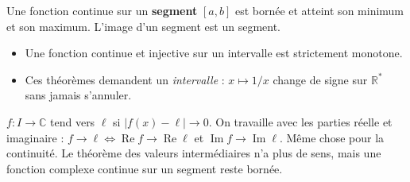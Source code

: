 \documentclass[11pt]{article}
\newcommand{\R}{\mathbb{R}}
\begin{document}
\begin{lthm}
Une fonction continue sur un \textbf{segment} $[a,b]$ est bornée et atteint son minimum et son maximum. L'image d'un segment est un segment.
\end{lthm}

\begin{itemize}
\item Une fonction continue et injective sur un intervalle est strictement monotone.
\item Ces théorèmes demandent un \emph{intervalle} : $x\mapsto 1/x$ change de signe sur $\R^*$ sans jamais s'annuler.
\end{itemize}


$f : I\to\mathbb{C}$ tend vers $\ell$ si $|f(x)-\ell|\to0$. On travaille avec les parties réelle et imaginaire : $f\to\ell \iff \operatorname{Re}f\to\operatorname{Re}\ell$ et $\operatorname{Im}f\to\operatorname{Im}\ell$. Même chose pour la continuité. Le théorème des valeurs intermédiaires n'a plus de sens, mais une fonction complexe continue sur un segment reste bornée.

\newpage
{}
\end{document}
